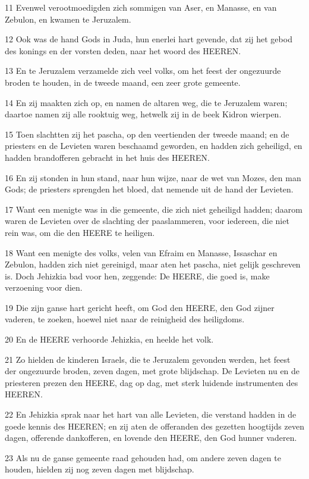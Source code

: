 \par 11 Evenwel verootmoedigden zich sommigen van Aser, en Manasse, en van Zebulon, en kwamen te Jeruzalem.
\par 12 Ook was de hand Gods in Juda, hun enerlei hart gevende, dat zij het gebod des konings en der vorsten deden, naar het woord des HEEREN.
\par 13 En te Jeruzalem verzamelde zich veel volks, om het feest der ongezuurde broden te houden, in de tweede maand, een zeer grote gemeente.
\par 14 En zij maakten zich op, en namen de altaren weg, die te Jeruzalem waren; daartoe namen zij alle rooktuig weg, hetwelk zij in de beek Kidron wierpen.
\par 15 Toen slachtten zij het pascha, op den veertienden der tweede maand; en de priesters en de Levieten waren beschaamd geworden, en hadden zich geheiligd, en hadden brandofferen gebracht in het huis des HEEREN.
\par 16 En zij stonden in hun stand, naar hun wijze, naar de wet van Mozes, den man Gods; de priesters sprengden het bloed, dat nemende uit de hand der Levieten.
\par 17 Want een menigte was in die gemeente, die zich niet geheiligd hadden; daarom waren de Levieten over de slachting der paaslammeren, voor iedereen, die niet rein was, om die den HEERE te heiligen.
\par 18 Want een menigte des volks, velen van Efraim en Manasse, Issaschar en Zebulon, hadden zich niet gereinigd, maar aten het pascha, niet gelijk geschreven is. Doch Jehizkia bad voor hen, zeggende: De HEERE, die goed is, make verzoening voor dien.
\par 19 Die zijn ganse hart gericht heeft, om God den HEERE, den God zijner vaderen, te zoeken, hoewel niet naar de reinigheid des heiligdoms.
\par 20 En de HEERE verhoorde Jehizkia, en heelde het volk.
\par 21 Zo hielden de kinderen Israels, die te Jeruzalem gevonden werden, het feest der ongezuurde broden, zeven dagen, met grote blijdschap. De Levieten nu en de priesteren prezen den HEERE, dag op dag, met sterk luidende instrumenten des HEEREN.
\par 22 En Jehizkia sprak naar het hart van alle Levieten, die verstand hadden in de goede kennis des HEEREN; en zij aten de offeranden des gezetten hoogtijds zeven dagen, offerende dankofferen, en lovende den HEERE, den God hunner vaderen.
\par 23 Als nu de ganse gemeente raad gehouden had, om andere zeven dagen te houden, hielden zij nog zeven dagen met blijdschap.
